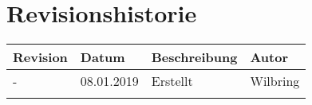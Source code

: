 \section*{Revisionshistorie}
\begin{tabular}{|p{2cm}|p{2cm}|p{7cm}|p{2cm}|}
\hline
Revision & Datum & Beschreibung & Autor  \\
\hline
 -  &   08.01.2019 & Erstellt   & Wilbring  \\\hline
    &               &           &           \\\hline
\end{tabular}